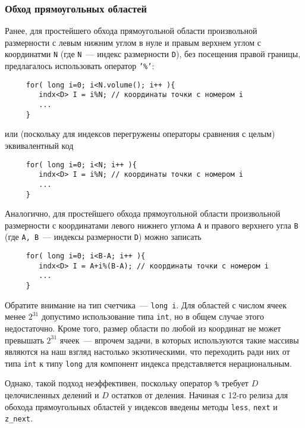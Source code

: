 \subsubsection{Обход прямоугольных областей}
Ранее, для простейшего обхода прямоугольной области произвольной размерности с левым нижним углом в нуле и
правым верхнем углом с координатми {\tt N} (где {\tt N}~--- индекс размерности
{\tt D}), без посещения правой границы, предлагалось использовать оператор {\tt '\%'}:
\begin{verbatim}
     for( long i=0; i<N.volume(); i++ ){
        indx<D> I = i%N; // координаты точки с номером i
        ...
     }
\end{verbatim}
или (поскольку для индексов перегружены операторы сравнения с целым) эквивалентный код
\begin{verbatim}
     for( long i=0; i<N; i++ ){
        indx<D> I = i%N; // координаты точки с номером i
        ...
     }
\end{verbatim}
Аналогично, для простейшего обхода прямоугольной области произвольной размерности с
координатами левого
нижнего углома  {\tt A} и
правого верхнего угла {\tt В} (где {\tt A, B}~--- индексы размерности
{\tt D}) можно записать
\begin{verbatim}
     for( long i=0; i<B-A; i++ ){
        indx<D> I = A+i%(B-A); // координаты точки с номером i
        ...
     }
\end{verbatim}
Обратите внимание на тип счетчика~--- {\tt long i}. Для областей с числом
ячеек менее $2^{31}$ допустимо использование типа {\tt int}, но в
общем случае этого недостаточно. Кроме того, размер области по любой из
координат не может превышать $2^{31}$ ячеек~--- впрочем задачи, в которых
используются такие массивы являются на наш взгляд настолько экзотическими, что
переходить ради них от типа {\tt int} к типу {\tt long} для компонент индекса
представляется нерациональным.

Однако, такой подход неэффективен, поскольку оператор \verb'%' требует $D$ целочисленных делений и $D$ остатков от деления.
Начиная с 12-го релиза для обохода прямоугольных областей у индексов введены методы \verb'less', \verb'next' и \verb'z_next'.
